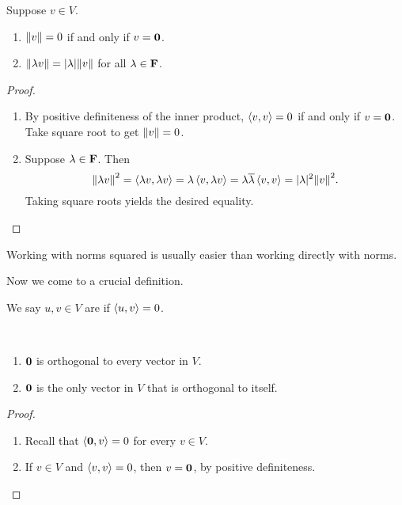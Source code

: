 \begin{lemma}
Suppose $v\in V$.
\begin{enumerate}[label=(\roman*)]
\item $\norm{v}=0$ if and only if $v=\vb{0}$.
\item $\norm{\lambda v}=|\lambda|\norm{v}$ for all $\lambda\in\mathbf F$.
\end{enumerate}
\end{lemma}

\begin{proof} \
\begin{enumerate}[label=(\roman*)]
\item By positive definiteness of the inner product, $\left\langle v,v\right\rangle=0$ if and only if $v=\vb{0}$. Take square root to get $\norm{v}=0$.
\item Suppose $\lambda\in\mathbf F$. Then
\[\norm{\lambda v}^2
=\left\langle\lambda v,\lambda v\right\rangle
=\lambda\left\langle v,\lambda v\right\rangle
=\lambda\overline{\lambda}\left\langle v,v\right\rangle
=|\lambda|^2\norm{v}^2.\]
Taking square roots yields the desired equality.
\end{enumerate}
\end{proof}

\begin{remark}
Working with norms squared is usually easier than working directly with norms.
\end{remark}

Now we come to a crucial definition.

\begin{definition}
We say $u,v\in V$ are  if $\left\langle u,v\right\rangle=0$.
\end{definition}

\begin{lemma}[Orthogonality and $\vb{0}$] \
\begin{enumerate}[label=(\roman*)]
\item $\vb{0}$ is orthogonal to every vector in $V$.
\item $\vb{0}$ is the only vector in $V$ that is orthogonal to itself.
\end{enumerate}
\end{lemma}

\begin{proof} \
\begin{enumerate}[label=(\roman*)]
\item Recall that $\left\langle\vb{0},v\right\rangle=0$ for every $v\in V$.
\item  If $v\in V$ and $\left\langle v,v\right\rangle=0$, then $v=\vb{0}$, by positive definiteness.
\end{enumerate}
\end{proof}

